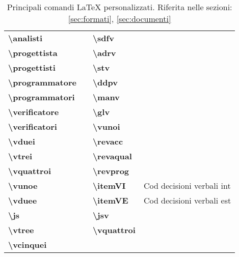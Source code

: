 \begin{table}[H]
{\begin{tabular}{llll}
		\textbf{\textbackslash analisti} & \analisti & \textbf{\textbackslash sdfv}     & \sdfv \\
		\textbf{\textbackslash progettista} & \progettista & \textbf{\textbackslash adrv}     & \adrv \\
		\textbf{\textbackslash progettisti} & \progettisti & \textbf{\textbackslash stv}      & \stv \\
		\textbf{\textbackslash programmatore} & \programmatore & \textbf{\textbackslash ddpv}     & \ddpv \\
		\textbf{\textbackslash programmatori} & \programmatori & \textbf{\textbackslash manv} & \manv \\
		\textbf{\textbackslash verificatore} & \verificatore & \textbf{\textbackslash glv} & \glv \\
		\textbf{\textbackslash verificatori} & \verificatori & \textbf{\textbackslash vunoi} & \vunoi \\
		\textbf{\textbackslash vduei} &   \vduei & \textbf{\textbackslash revacc}   & \revacc \\
		\textbf{\textbackslash vtrei} & \vtrei & \textbf{\textbackslash revaqual} & \revaqual \\
		\textbf{\textbackslash vquattroi} & \vquattroi & \textbf{\textbackslash revprog}  & \revprog \\
		\textbf{\textbackslash vunoe}  & \vunoe & \textbf{\textbackslash itemVI}   & Cod decisioni verbali int \\
		\textbf{\textbackslash vduee} & \vduee & \textbf{\textbackslash itemVE}   & Cod decisioni verbali est \\
		\textbf{\textbackslash js} & \js & \textbf{\textbackslash jsv} & \jsv \\
		\textbf{\textbackslash vtree}  & \vtree & \textbf{\textbackslash vquattroi} & \vquattroi \\
		\textbf{\textbackslash vcinquei}  & \vcinquei &  &  \\
		
		\bottomrule
	\end{tabular}}
	\caption{Principali comandi \LaTeX{} personalizzati. Riferita nelle sezioni: \ref{sec:formati}, \ref{sec:documenti}} 
\end{table}